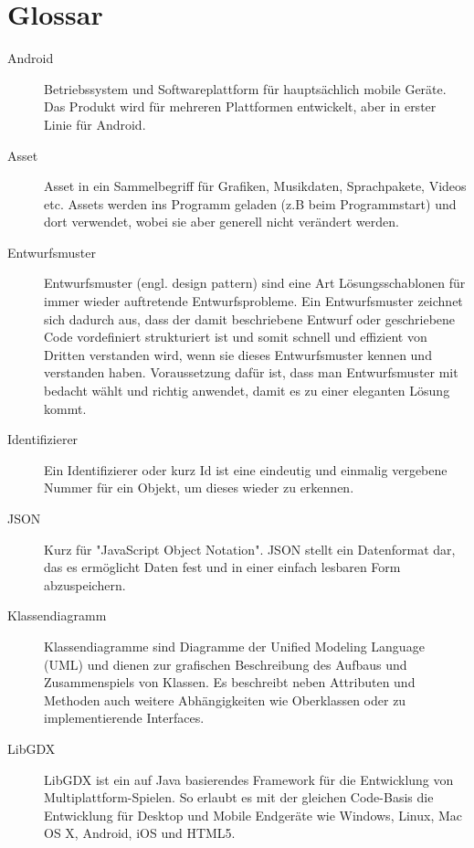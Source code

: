 \section{Glossar}
\begin{description}

\item[Android]
Betriebssystem und Softwareplattform für hauptsächlich mobile Geräte.
Das Produkt wird für mehreren Plattformen entwickelt, aber in erster Linie für Android.

\item[Asset]
Asset in ein Sammelbegriff für Grafiken, Musikdaten, Sprachpakete, Videos etc. 
Assets werden ins Programm geladen (z.B beim Programmstart) und dort verwendet, wobei sie aber generell nicht verändert werden.

\item[Entwurfsmuster]
Entwurfsmuster (engl. design pattern) sind eine Art Lösungsschablonen für immer wieder auftretende Entwurfsprobleme. Ein Entwurfsmuster zeichnet sich dadurch aus, dass der damit beschriebene Entwurf oder geschriebene Code vordefiniert strukturiert ist und somit schnell und effizient von Dritten verstanden wird, wenn sie dieses Entwurfsmuster kennen und verstanden haben. Voraussetzung dafür ist, dass man Entwurfsmuster mit bedacht wählt und richtig anwendet, damit es zu einer eleganten Lösung kommt.

\item[Identifizierer]
Ein Identifizierer oder kurz Id ist eine eindeutig und einmalig vergebene Nummer für ein Objekt, um dieses wieder zu erkennen.

\item[JSON]
Kurz für "JavaScript Object Notation". JSON stellt ein Datenformat dar, das es ermöglicht Daten fest und in einer einfach lesbaren Form abzuspeichern.

\item[Klassendiagramm]
Klassendiagramme sind Diagramme der Unified Modeling Language (UML) und dienen zur grafischen Beschreibung des Aufbaus und Zusammenspiels von Klassen.
Es beschreibt neben Attributen und Methoden auch weitere Abhängigkeiten wie Oberklassen oder zu implementierende Interfaces.

\item[LibGDX]
LibGDX ist ein auf Java basierendes Framework für die Entwicklung von Multiplattform-Spielen. So erlaubt es mit der gleichen Code-Basis die Entwicklung für Desktop und Mobile Endgeräte wie Windows, Linux, Mac OS X, Android, iOS und HTML5. 


\end{description}
